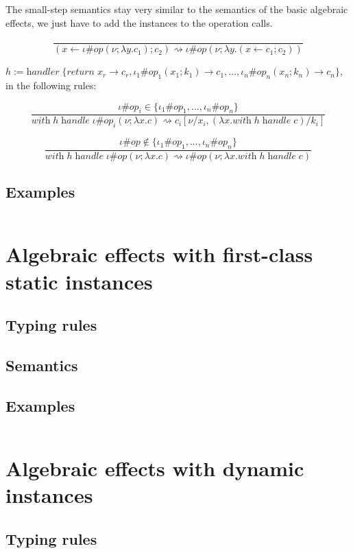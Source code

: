 \documentclass[12pt]{article}
\newcommand\eop[0]{\textit{op}}
\newcommand\inst[0]{\iota}
\newcommand\val[0]{\nu}
\newcommand\vabs[2]{\lambda #1 . #2}
\newcommand\vhandler[1]{\textit{handler} \; \{#1\}}
\newcommand\comp[0]{c}
\newcommand\copi[5]{#1 \# #2(#3 ; \lambda #4 . #5)}
\newcommand\cdo[3]{#1 \leftarrow #2 ; #3}
\newcommand\chandle[2]{\textit{with} \; #1 \; \textit{handle} \; #2}
\begin{document}
The small-step semantics stay very similar to the semantics of the basic algebraic effects, we just have to add the instances to the operation calls.

\[\frac{
}{
	(\cdo{x}{\copi{\inst}{\eop}{\val}{y}{\comp_1}}{\comp_2}) \rightsquigarrow \copi{\inst}{\eop}{\val}{y}{(\cdo{x}{\comp_1}{\comp_2})}
}\]

\vspace{20pt}
$h := \vhandler{
		\textit{return} \; x_r \rightarrow \comp_r,
		\inst_1\#\eop_1 (  x_1 ; k_1 ) \rightarrow \comp_1,
		...,
		\inst_n\#\eop_n ( x_n ; k_n ) \rightarrow \comp_n
	}$, in the following rules:
	
\[\frac{
	\inst\#\eop_i \in \{ \inst_1\#\eop_1, ..., \inst_n\#\eop_n \}
}{
	\chandle{h}{\copi{\inst}{\eop_i}{\val}{x}{\comp}} \rightsquigarrow \comp_i[\val / x_i, (\vabs{x}{\chandle{h}{\comp}}) / k_i]
}\]

\[\frac{
	\inst\#\eop \notin \{ \inst_1\#\eop_1, ..., \inst_n\#\eop_n \}
}{
	\chandle{h}{\copi{\inst}{\eop}{\val}{x}{\comp}} \rightsquigarrow \copi{\inst}{\eop}{\val}{x}{\chandle{h}{\comp}}
}\]

\subsection{Examples}
\inputminted{haskell}{code4.txt}

\newpage
\section{Algebraic effects with first-class static instances}
\subsection{Typing rules}
\subsection{Semantics}
\subsection{Examples}
\inputminted{haskell}{code5.txt}

\newpage
\section{Algebraic effects with dynamic instances}
\subsection{Typing rules}
\end{document}
